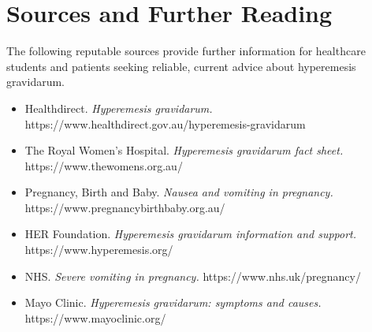 \section*{Sources and Further Reading}
The following reputable sources provide further information for healthcare students and patients seeking reliable, current advice about hyperemesis gravidarum.

\begin{itemize}
    \item Healthdirect. \textit{Hyperemesis gravidarum.} https://www.healthdirect.gov.au/hyperemesis-gravidarum
    \item The Royal Women's Hospital. \textit{Hyperemesis gravidarum fact sheet.} https://www.thewomens.org.au/
    \item Pregnancy, Birth and Baby. \textit{Nausea and vomiting in pregnancy.} https://www.pregnancybirthbaby.org.au/
    \item HER Foundation. \textit{Hyperemesis gravidarum information and support.} https://www.hyperemesis.org/
    \item NHS. \textit{Severe vomiting in pregnancy.} https://www.nhs.uk/pregnancy/
    \item Mayo Clinic. \textit{Hyperemesis gravidarum: symptoms and causes.} https://www.mayoclinic.org/
\end{itemize}
